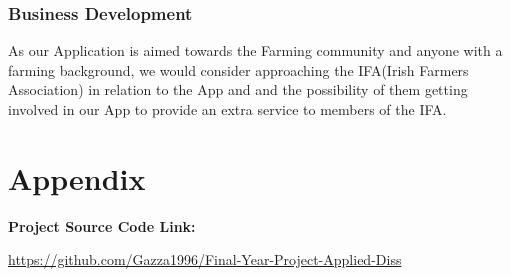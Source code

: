 \documentclass[12pt,a4paper,oneside,openany]{book}
\begin{document}
\subsection{Business Development}
As our Application is aimed towards the Farming community and anyone with a farming background, we would consider approaching the IFA(Irish Farmers Association) in relation to the App and and the possibility of them getting involved in our App to provide an extra service to members of the IFA.

\chapter{Appendix}

\textbf{Project Source Code Link:} \\
\item \href{https://github.com/Gazza1996/Final-Year-Project-Applied-Diss}{https://github.com/Gazza1996/Final-Year-Project-Applied-Diss} 




\nocite{*}
\end{document}
